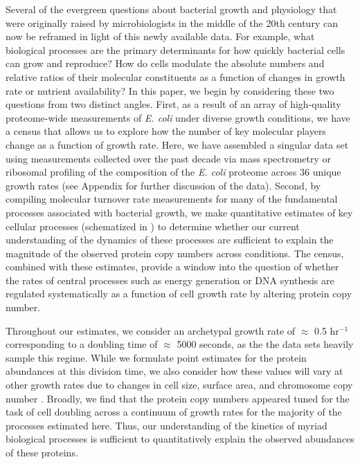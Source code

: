Several of the evergreen questions about bacterial growth and physiology that
were originally raised by microbiologists in the middle of the 20th century
can now be reframed in light of this newly available data. For example, what
biological processes are the primary determinants for how quickly bacterial
cells can grow and reproduce? How do cells modulate the absolute numbers and
relative ratios of their molecular constituents as a function of changes in
growth rate or nutrient availability? In this paper, we begin by considering these two
questions from two distinct angles. First, as a result of an array of
high-quality proteome-wide measurements of \textit{E. coli} under diverse
growth conditions, we have a census that allows us to explore how the number
of key molecular players change as a function of growth rate. Here, we have
assembled a singular data set using measurements collected over the past
decade via mass spectrometry \citep{schmidt2016, peebo2015, valgepea2013} or
ribosomal profiling \citep{li2014} of the composition of the \textit{E. coli}
proteome across 36 unique growth rates (see Appendix
 for further discussion of the data). Second, by
compiling molecular turnover rate measurements for many of the fundamental
processes associated with bacterial growth, we make quantitative estimates of
key cellular processes (schematized in ) to determine whether
our current understanding of the dynamics of these processes are sufficient
to explain the magnitude of the observed protein copy numbers across
conditions. The census, combined with these estimates, provide a window into
the question of whether the rates of central processes such as energy
generation or DNA synthesis are regulated systematically as a function of
cell growth rate by altering protein copy number.

Throughout our estimates, we consider an archetypal growth rate of $\approx$ 0.5
hr$^{-1}$ corresponding to a doubling time of $\approx$ 5000 seconds, as the the
data sets heavily sample this regime. While we formulate point estimates for the
protein abundances at this division time, we also consider how these values will
vary at other growth rates due to changes in cell size, surface area, and
chromosome copy number \citep{taheriaraghi2015}. Broadly, we find that the
protein copy numbers appeared tuned for the task of cell doubling across a
continuum of growth rates for the majority of the processes estimated here.
Thus, our understanding of the kinetics of myriad biological processes is
sufficient to quantitatively explain the observed abundances of these proteins.

